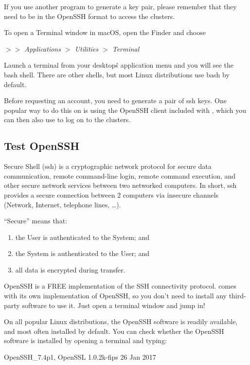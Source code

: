   If you use another program to generate a key pair, please remember that they
  need to be in the OpenSSH format to access the \hpc clusters.
\fi %

\ifmac
  To open a Terminal window in macOS, open the Finder and choose

  \emph{$>$$>$ Applications $>$ Utilities $>$ Terminal}
\fi

\iflinux
  Launch a terminal from your desktop\'s application menu and you will see the
  bash shell.
  There are other shells, but most Linux distributions use bash by default.
\fi

\ifmacORlinux
  Before requesting an account, you need to generate a pair of ssh keys. One
  popular way to do this on \OS is using the OpenSSH client included with \OS
  , which you can then also use to log on to the clusters.

  \subsection{Test OpenSSH}
  \label{sec:test-openssh}

  Secure Shell (ssh) is a cryptographic network protocol for secure data
  communication, remote command-line login, remote command execution, and other
  secure network services between two networked computers. In short, ssh
  provides a secure connection between 2 computers via insecure channels
  (Network, Internet, telephone lines, \ldots).

  ``Secure'' means that:
  \begin{enumerate}
    \item  the User is authenticated to the System; and
    \item  the System is authenticated to the User; and
    \item  all data is encrypted during transfer.
  \end{enumerate}

  OpenSSH is a FREE implementation of the SSH connectivity protocol. \OS comes
  with its own implementation of OpenSSH, so you don't need to install any
  third-party software to use it. Just open a terminal window and jump in!

  On all popular Linux distributions, the OpenSSH software is readily
  available, and most often installed by default. You can check whether the
  OpenSSH software is installed by opening a terminal and typing:

\begin{prompt}
OpenSSH_7.4p1, OpenSSL 1.0.2k-fips  26 Jan 2017
\end{prompt}

